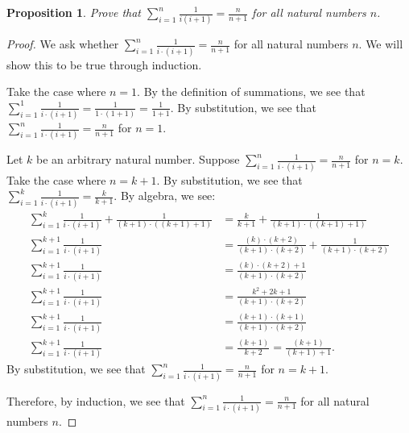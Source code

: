\documentclass{amsart}
\newtheorem*{proposition}{Proposition}
\numberwithin{equation}{section}
\begin{document}
	\begin{problem}[manual-num=59]
		\begin{proposition}
			Prove that $\sum_{i=1}^{n} \frac{1}{i(i+1)} = \frac{n}{n+1}$ for all natural numbers $n$.

		\end{proposition}

		\begin{proof}
			We ask whether $\sum_{i = 1}^{n} \frac{1}{i \cdot (i + 1)} = \frac{n}{n + 1}$ for all natural numbers $n$.
			We will show this to be true through induction.

			Take the case where $n = 1$.
			By the definition of summations, we see that $\sum_{i = 1}^{1} \frac{1}{i \cdot (i + 1)} = \frac{1}{1 \cdot (1 + 1)} = \frac{1}{1 + 1}$.
			By substitution, we see that $\sum_{i = 1}^{n} \frac{1}{i \cdot (i + 1)} = \frac{n}{n + 1}$ for $n = 1$.

			Let $k$ be an arbitrary natural number. Suppose $\sum_{i = 1}^{n} \frac{1}{i \cdot (i + 1)} = \frac{n}{n + 1}$ for $n = k$.
			Take the case where $n = k + 1$.
			By substitution, we see that $\sum_{i = 1}^{k} \frac{1}{i \cdot (i + 1)} = \frac{k}{k + 1}$.
			By algebra, we see:
			\begin{align*}
				\sum_{i = 1}^{k} \frac{1}{i \cdot (i + 1)} + \frac{1}{(k + 1) \cdot ((k + 1) + 1)} &= \frac{k}{k + 1} + \frac{1}{(k + 1) \cdot ((k + 1) + 1)} \\
				\sum_{i = 1}^{k + 1} \frac{1}{i \cdot (i + 1)} &= \frac{(k) \cdot (k + 2)}{(k + 1) \cdot(k + 2)} + \frac{1}{(k + 1) \cdot (k + 2)} \\
				\sum_{i = 1}^{k + 1} \frac{1}{i \cdot (i + 1)} &= \frac{(k) \cdot (k + 2) + 1}{(k + 1) \cdot (k + 2)} \\
				\sum_{i = 1}^{k + 1} \frac{1}{i \cdot (i + 1)} &= \frac{k^2 + 2k + 1}{(k + 1) \cdot (k + 2)} \\
				\sum_{i = 1}^{k + 1} \frac{1}{i \cdot (i + 1)} &= \frac{(k + 1) \cdot (k + 1)}{(k + 1) \cdot (k + 2)} \\
				\sum_{i = 1}^{k + 1} \frac{1}{i \cdot (i + 1)} &= \frac{(k + 1)}{k + 2} = \frac{(k + 1)}{(k + 1) + 1}.
			\end{align*}
			By substitution, we see that $\sum_{i = 1}^{n} \frac{1}{i \cdot (i + 1)} = \frac{n}{n + 1}$ for $n = k + 1$.

			Therefore, by induction, we see that $\sum_{i = 1}^{n} \frac{1}{i \cdot (i + 1)} = \frac{n}{n + 1}$ for all natural numbers $n$.
		\end{proof}
	\end{problem}
\end{document}
